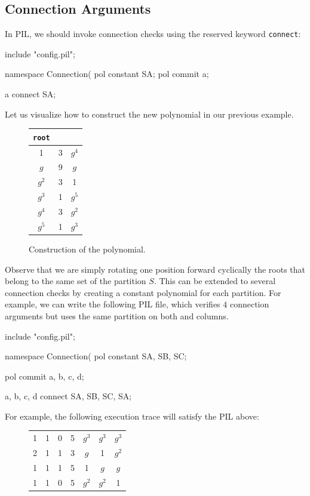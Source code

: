 \subsection{Connection Arguments}

In PIL, we should invoke connection checks using the reserved keyword \texttt{connect}:

\begin{pil}
include "config.pil";

namespace Connection(%
    pol constant SA;
    pol commit a;

    {a} connect {SA};
\end{pil}

Let us visualize how to construct the new polynomial in our previous example. 

\begin{figure}[H]
\centering
\begin{tabular}{|c|c|c|}
\hline
\texttt{root}	&\att	&\SA	\\ \hline
1				&3			&$g^4$		\\
$g$		&9			&$g$		\\
$g^2$		&3			&1				\\
$g^3$		&1			&$g^5$		\\
$g^4$		&3			&$g^2$		\\
$g^5$		&1			&$g^3$		\\
\hline
\end{tabular}
\caption{Construction of the \SA polynomial. } 
\label{table:connection-arg-SA}
\end{figure}

Observe that we are simply rotating one position forward cyclically the roots that belong to the same set of the partition $S$. This can be extended to several connection checks by creating a constant polynomial for each partition. For example, we can write the following PIL file, which verifies $4$ connection arguments but uses the same partition on both \att and \dtt columns. 

\begin{pil}
include "config.pil";

namespace Connection(%
    pol constant SA, SB, SC;

    pol commit a, b, c, d;

    {a, b, c, d} connect {SA, SB, SC, SA};
\end{pil}

For example, the following execution trace will satisfy the PIL above:
\begin{figure}[H]
\centering
\begin{tabular}{|c|c|c|c|c|c|c|}
\hline
\att	&\btt	&\ctt	&\dtt	&\SA	&\SB	&\SC \\ \hline
1	&1	&0 &5 &$g^3$		&$g^3$ 	&$g^3$ 	\\
2	&1	&1 &3 &$g$ 		&1 				&$g^2$		\\
1	&1	&1 &5 &1 				&$g$ 		&$g$		\\
1	&1	&0 &5 &$g^2$ 		&$g^2$ 	&1				\\
\hline
\end{tabular}
\label{table:connection-arg-multi-example}
\end{figure}

